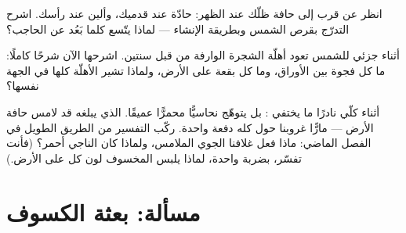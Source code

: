 \begin{exercise}[$\star\star$]\label{exo:g7:shadows-eclipses:10}
انظر عن قرب إلى حافة ظلّك عند الظهر: حادّة عند قدميك، وألين
عند  رأسك. اشرح التدرّج بقرص الشمس وبطريقة الإنشاء ---
لماذا يتّسع  كلما بَعُد عن الحاجب؟
\end{exercise}

\begin{exercise}[$\star\star$]\label{exo:g7:shadows-eclipses:11}
أثناء  جزئي للشمس تعود أهلّة الشجرة الوارفة من قبل سنتين.
اشرحها الآن شرحًا كاملًا: ما كل فجوة بين الأوراق، وما كل بقعة
على الأرض، ولماذا تشير الأهلّة كلها في الجهة نفسها؟
\end{exercise}

\begin{exercise}[$\star\star\star$]\label{exo:g7:shadows-eclipses:12}
أثناء  كلّي \emph{} نادرًا ما يختفي : بل يتوهّج
نحاسيًّا محمرًّا عميقًا.  الذي يبلغه قد لامس حافة الأرض
--- مارًّا  غروبنا حول  كله دفعة واحدة. ركّب التفسير
من  الطريق الطويل في الفصل الماضي: ماذا فعل غلافنا الجوي
 الملامس، ولماذا كان  الناجي أحمر؟ (فأنت تفسّر،
بضربة واحدة، لماذا يلبس  المخسوف لون كل  على الأرض.)
\end{exercise}

\section{مسألة: بعثة الكسوف}

